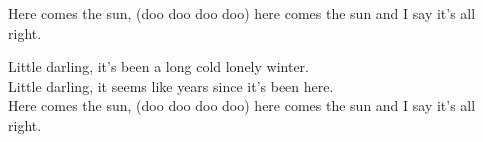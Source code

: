 \ns

	
\vspace{10mm}	
\ns	
\nv{}Here comes the sun, (doo doo doo doo) here comes the sun and I say it's all right.


\vspace{7mm}
\ns	
\nv{}Little darling, it's been a long cold lonely winter.\\
Little darling, it seems like years since it's been here.\\
Here comes the sun, (doo doo doo doo) here comes the sun and I say it's all right.

